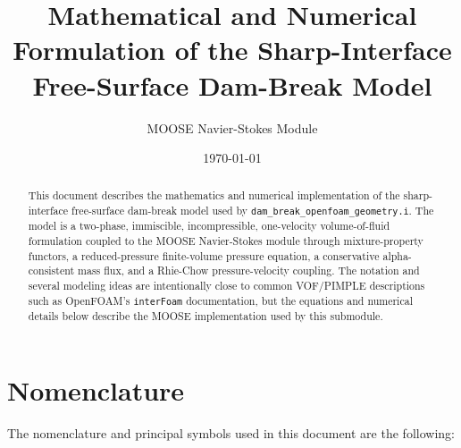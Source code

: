 \documentclass[11pt]{article}
\title{Mathematical and Numerical Formulation of the Sharp-Interface Free-Surface Dam-Break Model}
\author{MOOSE Navier-Stokes Module}
\date{\today}
\begin{document}
\maketitle

\begin{abstract}
This document describes the mathematics and numerical implementation of the
sharp-interface free-surface dam-break model used by
\texttt{dam\_break\_openfoam\_geometry.i}.  The model is a two-phase,
immiscible, incompressible, one-velocity volume-of-fluid formulation coupled to
the MOOSE Navier-Stokes module through mixture-property functors, a
reduced-pressure finite-volume pressure equation, a conservative
alpha-consistent mass flux, and a Rhie-Chow pressure-velocity coupling.  The
notation and several modeling ideas are intentionally close to common
VOF/PIMPLE descriptions such as OpenFOAM's \texttt{interFoam} documentation,
but the equations and numerical details below describe the MOOSE
implementation used by this submodule.
\end{abstract}

\tableofcontents

\section{Nomenclature}

The nomenclature and principal symbols used in this document are the following:
\end{document}
